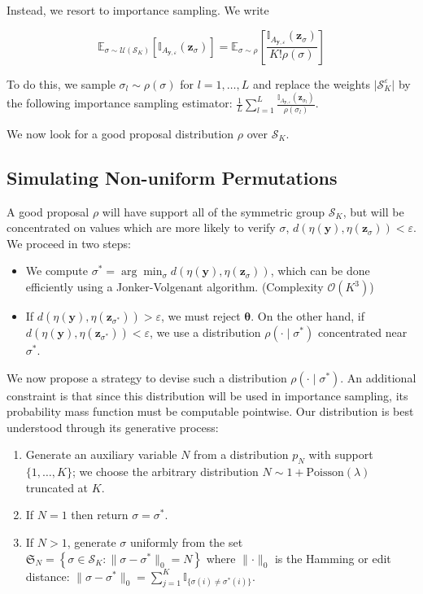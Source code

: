 \documentclass[11pt,a4paper]{article}
\def\iperm{l}
\def\obsdata{\mathbf{y}}
\def\param{\boldsymbol{\theta}}
\def\simdata{\mathbf{z}}
\theoremstyle{plain}
\theoremstyle{definition}
\theoremstyle{remark}
\begin{document}
Instead, we resort to importance sampling. We write

\[\mathbb{E}_{\sigma \sim \mathcal{U}(\mathcal{S}_K)}\left[\mathbb{I}_{A_{\obsdata,\varepsilon}}(\simdata_{\sigma})\right] = 
\mathbb{E}_{\sigma \sim \rho}\left[\frac{\mathbb{I}_{A_{\obsdata,\varepsilon}}(\simdata_{\sigma})}{K!\rho(\sigma)}\right]\]

To do this, we sample $\sigma_{\iperm} \sim \rho(\sigma)$ for $\iperm=1,\dots, L$ and replace the weights $\lvert \mathcal S_K^\varepsilon \rvert$ by the following importance sampling estimator: $\frac{1}{L}\sum_{l=1}^L \frac{\mathbb{I}_{A_{\obsdata,\varepsilon}}(\simdata_{\sigma_{\iperm}})}{\rho(\sigma_{\iperm})}$. 

We now look for a good proposal distribution $\rho$ over $\mathcal{S}_K$.

\subsection{Simulating Non-uniform Permutations}

A good proposal $\rho$ will have support all of the symmetric group $\mathcal{S}_K$, but will be concentrated on values which are more likely to verify $\sigma$, $d(\eta(\obsdata), \eta(\simdata_{\sigma})) < \varepsilon$. We proceed in two steps:

\begin{itemize}
    \item We compute $\sigma^* = \arg\min_{\sigma} d(\eta(\obsdata), \eta(\simdata_{\sigma}))$, which can be done efficiently using a Jonker-Volgenant algorithm. (Complexity $\mathcal{O}(K^3)$)
    \item If $d(\eta(\obsdata), \eta(\simdata_{\sigma^*})) > \varepsilon$, we must reject $\param$. On the other hand, if $d(\eta(\obsdata), \eta(\simdata_{\sigma^*})) < \varepsilon$, we use a distribution $\rho(\cdot\mid\sigma^*)$ concentrated near $\sigma^*$.
\end{itemize}

We now propose a strategy to devise such a distribution $\rho(\cdot\mid\sigma^*)$. An additional constraint is that since this distribution will be used in importance sampling, its probability mass function must be computable pointwise. Our distribution is best understood through its generative process:

\begin{enumerate}
    \item Generate an auxiliary variable $N$ from a distribution $p_N$ with support $\{1, \ldots, K\}$; we choose the arbitrary distribution $N \sim 1 + \text{Poisson}(\lambda)$ truncated at $K$.
    \item If $N = 1$ then return $\sigma = \sigma^*$.
    \item If $N > 1$, generate $\sigma$ uniformly from the set $\mathfrak{S}_N = \left\{\sigma \in \mathcal{S}_K: \lVert \sigma - \sigma^*\rVert_0 = N\right\}$ where $\lVert \cdot \rVert_0$ is the Hamming or edit distance: $\lVert\sigma - \sigma^*\rVert_0 = \sum_{j=1}^K \mathbb{I}_{\{\sigma(i) \neq \sigma^*(i)\}}$.
\end{enumerate}
\end{document}
